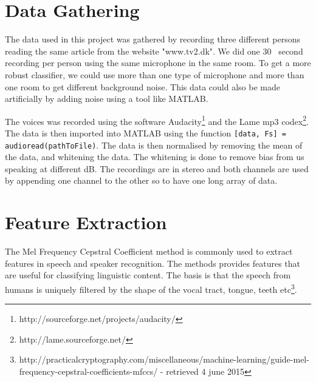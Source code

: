 
\section{Data Gathering}
The data used in this project was gathered by recording three different persons reading the same article from the website "www.tv2.dk".
We did one 30~ second recording per person using the same microphone in the same room.
To get a more robust classifier, we could use more than one type of microphone and more than one room to get different background noise.
This data could also be made artificially by adding noise using a tool like MATLAB.

The voices was recorded using the software Audacity\footnote{http://sourceforge.net/projects/audacity/} and the Lame mp3 codex\footnote{http://lame.sourceforge.net/}.
The data is then imported into MATLAB using the function \texttt{[data, Fs] = audioread(pathToFile)}. The data is then normalised by removing the mean of the data, and whitening the data. The whitening is done to remove bias from us speaking at different dB.
The recordings are in stereo and both channels are used by appending one channel to the other so to have one long array of data.

\section{Feature Extraction}
The Mel Frequency Cepstral Coefficient method is commonly used to extract features in speech and speaker recognition. The methods provides features that are useful for classifying linguistic content. The basis is that the speech from humans is uniquely filtered by the shape of the vocal tract, tongue, teeth etc\footnote{http://practicalcryptography.com/miscellaneous/machine-learning/guide-mel-frequency-cepstral-coefficients-mfccs/ - retrieved 4 june 2015}. 

